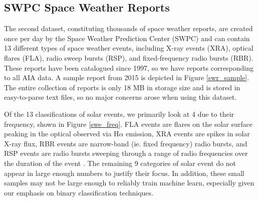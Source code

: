 \documentclass[12pt, letterpaper]{article}
\begin{document}
\subsection*{SWPC Space Weather Reports}
The second dataset, constituting thousands of space weather reports, are created once per day by the Space Weather Prediction Center (SWPC) and can contain 13 different types of space weather events, including X-ray events (XRA), optical flares (FLA), radio sweep bursts (RSP), and fixed-frequency radio bursts (RBR). These reports have been catalogued since 1997, so we have reports corresponding to all AIA data. A sample report from 2015 is depicted in Figure \ref{swr_sample}. The entire collection of reports is only 18 MB in storage size and is stored in easy-to-parse text files, so no major concerns arose when using this dataset.

Of the 13 classifications of solar events, we primarily look at 4 due to their frequency, shown in Figure \ref{swe_freq}. FLA events are flares on the solar surface peaking in the optical observed via H$\alpha$ emission, XRA events are spikes in solar X-ray flux, RBR events are narrow-band (ie. fixed frequency) radio bursts, and RSP events are radio bursts sweeping through a range of radio frequencies over the duration of the event \cite{SWPC_Glossary}. The remaining 9 categories of solar event do not appear in large enough numbers to justify their focus. In addition, these small samples may not be large enough to reliably train machine learn, especially given our emphasis on binary classification techniques.
\end{document}
